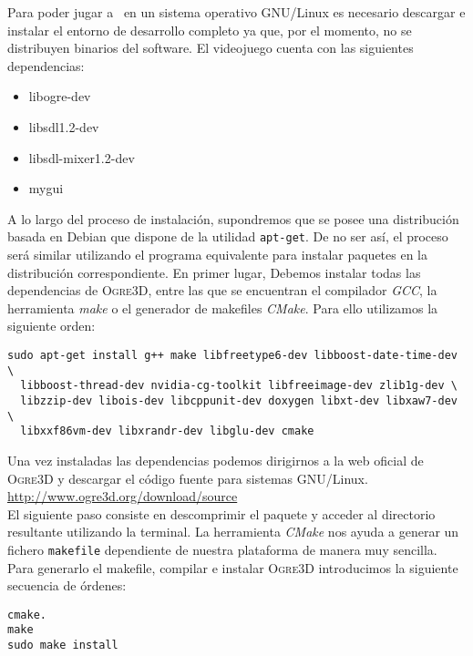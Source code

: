Para poder jugar a \juego\ en un sistema operativo GNU/Linux es necesario
descargar e instalar el entorno de desarrollo completo ya que, por el
momento, no se distribuyen binarios del software. El videojuego cuenta
con las siguientes dependencias:

\begin{itemize}
    \itemsep0em
    \item libogre-dev
    \item libsdl1.2-dev
    \item libsdl-mixer1.2-dev
    \item mygui
\end{itemize}

A lo largo del proceso de instalación, supondremos que se posee una distribución
basada en Debian que dispone de la utilidad \texttt{apt-get}. De no ser así,
el proceso será similar utilizando el programa equivalente para instalar
paquetes en la distribución correspondiente. En primer lugar, Debemos
instalar todas las dependencias de \textsc{Ogre3D}, entre las que
se encuentran el compilador \textit{GCC}, la herramienta \textit{make}
o el generador de makefiles \textit{CMake}. Para ello utilizamos
la siguiente orden:

\begin{lstlisting}[style=consola]
sudo apt-get install g++ make libfreetype6-dev libboost-date-time-dev \
  libboost-thread-dev nvidia-cg-toolkit libfreeimage-dev zlib1g-dev \
  libzzip-dev libois-dev libcppunit-dev doxygen libxt-dev libxaw7-dev \
  libxxf86vm-dev libxrandr-dev libglu-dev cmake
\end{lstlisting}

Una vez instaladas las dependencias podemos dirigirnos a la web oficial
de \textsc{Ogre3D} y descargar el código fuente para sistemas GNU/Linux.\\

\url{http://www.ogre3d.org/download/source}\\

El siguiente paso consiste en descomprimir el paquete y acceder al directorio
resultante utilizando la terminal. La herramienta \textit{CMake} nos ayuda
a generar un fichero \texttt{makefile} dependiente de nuestra plataforma
de manera muy sencilla. Para generarlo el makefile, compilar e instalar
\textsc{Ogre3D} introducimos la siguiente secuencia de órdenes:

\begin{lstlisting}[style=consola]
cmake.
make
sudo make install
\end{lstlisting}

